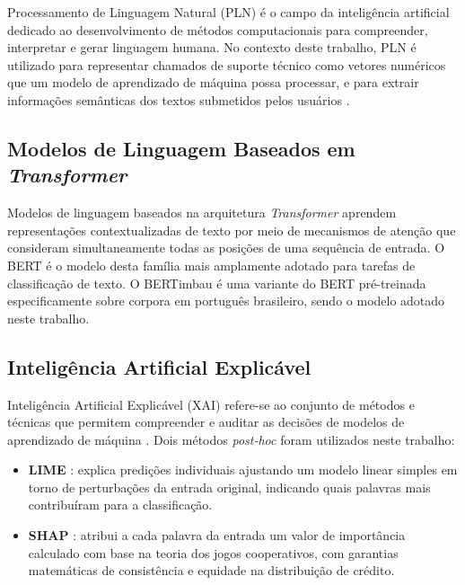 \documentclass[
    12pt,                %
    openright,           %
    oneside,             %
    a4paper,             %
    english,             %
    brazil               %
]{abntex2}
\begin{document}
Processamento de Linguagem Natural (PLN) é o campo da inteligência artificial dedicado ao desenvolvimento de métodos computacionais para compreender, interpretar e gerar linguagem humana. No contexto deste trabalho, PLN é utilizado para representar chamados de suporte técnico como vetores numéricos que um modelo de aprendizado de máquina possa processar, e para extrair informações semânticas dos textos submetidos pelos usuários \cite{devlin2019}.
 
\subsection{Modelos de Linguagem Baseados em \textit{Transformer}}
 
Modelos de linguagem baseados na arquitetura \textit{Transformer} \cite{vaswani2017} aprendem representações contextualizadas de texto por meio de mecanismos de atenção que consideram simultaneamente todas as posições de uma sequência de entrada. O BERT \cite{devlin2019} é o modelo desta família mais amplamente adotado para tarefas de classificação de texto. O BERTimbau \cite{souza2020} é uma variante do BERT pré-treinada especificamente sobre corpora em português brasileiro, sendo o modelo adotado neste trabalho.
 
\subsection{Inteligência Artificial Explicável}
 
Inteligência Artificial Explicável (XAI) refere-se ao conjunto de métodos e técnicas que permitem compreender e auditar as decisões de modelos de aprendizado de máquina \cite{salih2023}. Dois métodos \textit{post-hoc} foram utilizados neste trabalho:
 
\begin{itemize}
    \item \textbf{LIME} \cite{ribeiro2016}: explica predições individuais ajustando um modelo linear simples em torno de perturbações da entrada original, indicando quais palavras mais contribuíram para a classificação.
 
    \item \textbf{SHAP} \cite{lundberg2017}: atribui a cada palavra da entrada um valor de importância calculado com base na teoria dos jogos cooperativos, com garantias matemáticas de consistência e equidade na distribuição de crédito.
\end{itemize}
 
\end{document}
